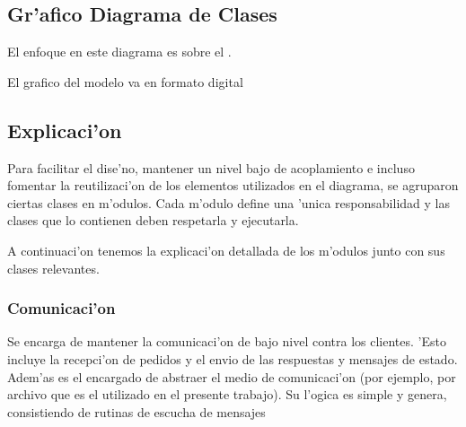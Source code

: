 \subsection{Gr'afico Diagrama de Clases}

El enfoque en este diagrama es sobre el .

El grafico del modelo va en formato digital

% 

% 

\clearpage

\subsection{Explicaci'on}
Para facilitar el dise'no, mantener un nivel bajo de acoplamiento e incluso fomentar la reutilizaci'on de los elementos utilizados en el diagrama, se agruparon ciertas clases en m'odulos. Cada m'odulo define una 'unica responsabilidad y las clases que lo contienen deben respetarla y ejecutarla.

A continuaci'on tenemos la explicaci'on detallada de los m'odulos junto con sus clases relevantes.


\subsubsection{Comunicaci'on}
Se encarga de mantener la comunicaci'on de bajo nivel contra los clientes. 'Esto incluye la recepci'on de pedidos y el envio de las respuestas y mensajes de estado. Adem'as es el encargado de abstraer el medio de comunicaci'on (por ejemplo, por archivo que es el utilizado en el presente trabajo). Su l'ogica es simple y genera, consistiendo de rutinas de escucha de mensajes



